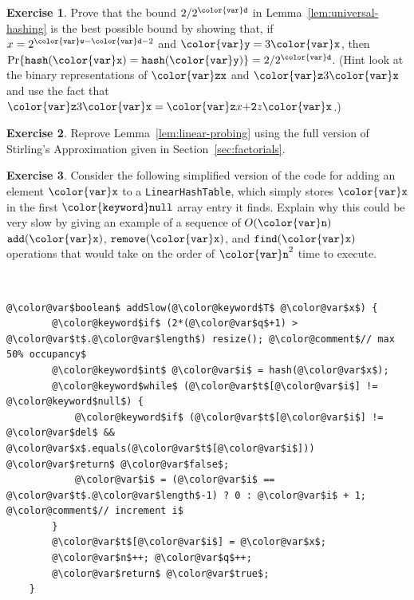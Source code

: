 \documentclass[10pt]{book}
\newcommand{\secref}[1]{Section~\ref{sec:#1}}
\theoremstyle{plain}
\newcommand{\lemref}[1]{Lemma~\ref{lem:#1}}
\theoremstyle{definition}
\newtheorem{exc}{Exercise}[chapter]
\newcommand{\exclabel}[1]{\label{exc:#1}}
\begin{document}
\begin{exc}
  Prove that the bound $2/2^{\ensuremath{\mathtt{{\color{var}d}}}}$ in \lemref{universal-hashing} is
  the best possible bound by showing that, if $x=2^{\ensuremath{\mathtt{{\color{var}w}}}-\ensuremath{\mathtt{{\color{var}d}}}-2}$ and
  $\ensuremath{\mathtt{{\color{var}y}}}=3\ensuremath{\mathtt{{\color{var}x}}}$, then $\Pr\{\ensuremath{\mathtt{hash({\color{var}x})}}=\ensuremath{\mathtt{hash({\color{var}y})}}\}=2/2^{\ensuremath{\mathtt{{\color{var}d}}}}$.  (Hint look
  at the binary representations of $\ensuremath{\mathtt{{\color{var}zx}}}$ and $\ensuremath{\mathtt{{\color{var}z}}}3\ensuremath{\mathtt{{\color{var}x}}}$ and use the fact
  that $\ensuremath{\mathtt{{\color{var}z}}}3\ensuremath{\mathtt{{\color{var}x}}} = \ensuremath{\mathtt{{\color{var}z}}}x\ensuremath{\mathtt{+2}}z\ensuremath{\mathtt{{\color{var}x}}}$.)
\end{exc}

\begin{exc}\exclabel{linear-probing}
  Reprove \lemref{linear-probing} using the full version of Stirling's
  Approximation given in \secref{factorials}.
\end{exc}

\begin{exc}
  Consider the following simplified version of the code for adding
  an element \ensuremath{\mathtt{{\color{var}x}}} to a \texttt{LinearHashTable}, which simply stores \ensuremath{\mathtt{{\color{var}x}}} in the
  first \ensuremath{\mathtt{{\color{keyword}null}}} array entry it finds.  Explain why this could be very slow
  by giving an example of a sequence of $O(\ensuremath{\mathtt{{\color{var}n}}})$ \ensuremath{\mathtt{add({\color{var}x})}}, \ensuremath{\mathtt{remove({\color{var}x})}},
  and \ensuremath{\mathtt{find({\color{var}x})}} operations that would take on the order of $\ensuremath{\mathtt{{\color{var}n}}}^2$
  time to execute.


 \ \vspace{.5ex}\begin{Verbatim}[gobble=1,tabsize=2,frame=single,framerule=1.2pt,commandchars=\\@\$,label=\texttt{LinearHashTable},labelposition=topline]
	@\color@var$boolean$ addSlow(@\color@keyword$T$ @\color@var$x$) {
		@\color@keyword$if$ (2*(@\color@var$q$+1) > @\color@var$t$.@\color@var$length$) resize(); @\color@comment$// max 50% occupancy$
		@\color@keyword$int$ @\color@var$i$ = hash(@\color@var$x$);
		@\color@keyword$while$ (@\color@var$t$[@\color@var$i$] != @\color@keyword$null$) {
			@\color@keyword$if$ (@\color@var$t$[@\color@var$i$] != @\color@var$del$ && @\color@var$x$.equals(@\color@var$t$[@\color@var$i$])) @\color@var$return$ @\color@var$false$;
			@\color@var$i$ = (@\color@var$i$ == @\color@var$t$.@\color@var$length$-1) ? 0 : @\color@var$i$ + 1; @\color@comment$// increment i$
		}
		@\color@var$t$[@\color@var$i$] = @\color@var$x$;
		@\color@var$n$++; @\color@var$q$++;
		@\color@var$return$ @\color@var$true$;
	}
\end{Verbatim}

\end{exc}
\end{document}
